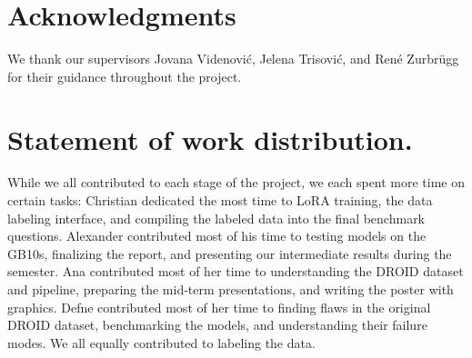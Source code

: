 \section*{Acknowledgments}
We thank our supervisors Jovana Videnovi\'{c}, Jelena Trisovi\'{c}, and Ren\'{e} Zurbr\"{u}gg for their guidance throughout the project.

\section{Statement of work distribution.}
While we all contributed to each stage of the project, we each spent more time on certain tasks:
Christian dedicated the most time to LoRA training, the data labeling interface, and compiling the labeled data into the final benchmark questions.
Alexander contributed most of his time to testing models on the GB10s, finalizing the report, and presenting our intermediate results during the semester.
Ana contributed most of her time to understanding the DROID dataset and pipeline, preparing the mid-term presentations, and writing the poster with graphics.
Defne contributed most of her time to finding flaws in the original DROID dataset, benchmarking the models, and understanding their failure modes.
We all equally contributed to labeling the data.